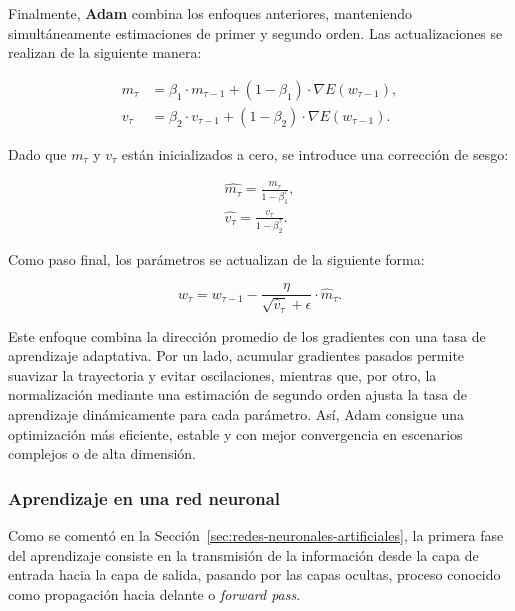 Finalmente, \textbf{Adam} combina los enfoques anteriores, manteniendo simultáneamente estimaciones de primer y segundo orden. Las actualizaciones se realizan de la siguiente manera:

\begin{equation}
    \begin{aligned}
        m_{\tau} &= \beta_1 \cdot m_{\tau-1} + (1 - \beta_1) \cdot \nabla E(w_{\tau - 1}), \\
        v_{\tau} &= \beta_2 \cdot v_{\tau-1} + (1 - \beta_2) \cdot \nabla E(w_{\tau - 1}).
    \end{aligned}
\end{equation}

Dado que $m_\tau$ y $v_\tau$ están inicializados a cero, se introduce una corrección de sesgo:

\begin{equation}
    \begin{aligned}
        \hat{m_\tau} = \frac{m_\tau}{1- \beta_1^{\tau}}, \\
        \hat{v_\tau} = \frac{v_\tau}{1- \beta_2^{\tau}}.
    \end{aligned}
\end{equation}

Como paso final, los parámetros se actualizan de la siguiente forma:

\begin{equation}
    w_{\tau} = w_{\tau - 1} - \frac{\eta}{\sqrt{\hat{v}_{\tau}} + \epsilon} \cdot \hat{m}_{\tau}.
\end{equation}

Este enfoque combina la dirección promedio de los gradientes con una tasa de aprendizaje adaptativa. Por un lado, acumular gradientes pasados permite suavizar la trayectoria y evitar oscilaciones, mientras que, por otro, la normalización mediante una estimación de segundo orden ajusta la tasa de aprendizaje dinámicamente para cada parámetro. Así, Adam consigue una optimización más eficiente, estable y con mejor convergencia en escenarios complejos o de alta dimensión.

\subsubsection{Aprendizaje en una red neuronal}\label{subsubsec:aprendizaje-red-neuronal}

Como se comentó en la Sección~\ref{sec:redes-neuronales-artificiales}, la primera fase del aprendizaje consiste en la transmisión de la información desde la capa de entrada hacia la capa de salida, pasando por las capas ocultas, proceso conocido como propagación hacia delante o \emph{forward pass}. 

